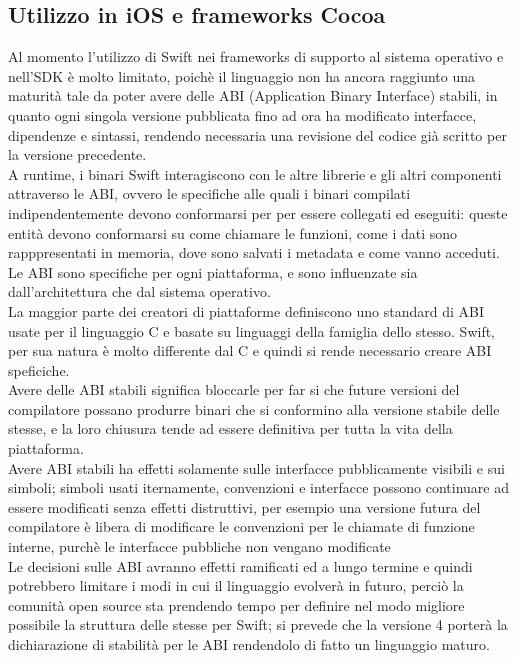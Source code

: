 \subsection{Utilizzo in iOS e frameworks Cocoa}
Al momento l'utilizzo di Swift nei frameworks di supporto al sistema operativo e nell'SDK è molto limitato, poichè il linguaggio non ha ancora raggiunto una maturità tale da poter avere delle ABI (Application Binary Interface) stabili, in quanto ogni singola versione pubblicata fino ad ora ha modificato interfacce, dipendenze e sintassi, rendendo necessaria una revisione del codice già scritto per la versione precedente.\\
A runtime, i binari Swift interagiscono con le altre librerie e gli altri componenti attraverso le ABI, ovvero le specifiche alle quali i binari compilati indipendentemente devono conformarsi per per essere collegati ed eseguiti: queste entità devono conformarsi su come chiamare le funzioni, come i dati sono rapppresentati in memoria, dove sono salvati i metadata e come vanno acceduti.\\
Le ABI sono specifiche per ogni piattaforma, e sono influenzate sia dall'architettura che dal sistema operativo.\\La maggior parte dei creatori di piattaforme definiscono uno standard di ABI usate per il linguaggio C e basate su linguaggi della famiglia dello stesso. Swift, per sua natura è molto differente dal C e quindi si rende necessario creare ABI speficiche.\\
Avere delle ABI stabili significa bloccarle per far si che future versioni del compilatore possano produrre binari che si conformino alla versione stabile delle stesse, e la loro chiusura tende ad essere definitiva per tutta la vita della piattaforma.\\
Avere ABI stabili ha effetti solamente sulle interfacce pubblicamente visibili e sui simboli; simboli usati iternamente, convenzioni e interfacce possono continuare ad essere modificati senza effetti distruttivi, per esempio una versione futura del compilatore è libera di modificare le convenzioni per le chiamate di funzione interne, purchè le interfacce pubbliche non vengano modificate\\
Le decisioni sulle ABI avranno effetti ramificati ed a lungo termine e quindi potrebbero limitare i modi in cui il linguaggio evolverà in futuro, perciò la comunità open source sta prendendo tempo per definire nel modo migliore possibile la struttura delle stesse per Swift; si prevede che la versione 4 porterà la dichiarazione di stabilità per le ABI rendendolo di fatto un linguaggio maturo.